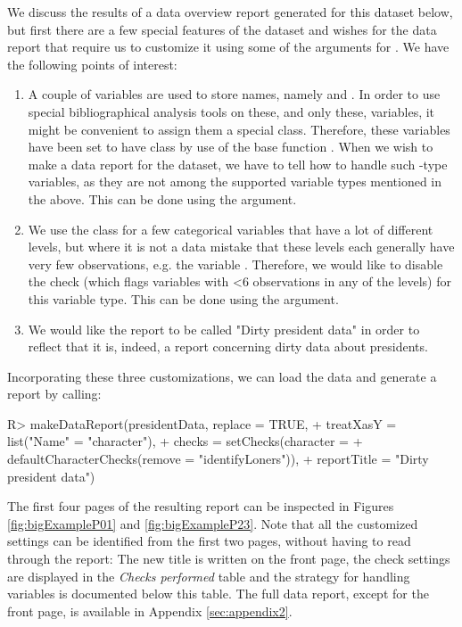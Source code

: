 \documentclass[article,shortnames]{jss}
\begin{document}
We discuss the results of a data overview report generated for this dataset below, but first there are a few special features of the dataset and wishes for the data report that require us to customize it using some of the arguments for . We have the following points of interest:
\begin{enumerate}
\item A couple of variables are used to store names, namely  and . In order to use special bibliographical analysis tools on these, and only these, variables, it might be convenient to assign them a special class. Therefore, these variables have been set to have class  by use of the base  function . When we wish to make a data report for the dataset, we have to tell  how to handle such -type variables, as they are not among the supported variable types mentioned in the above. This can be done using the  argument.
\item We use the  class for a few categorical variables that have a lot of different levels, but where it is not a data mistake that these levels each generally have very few observations, e.g. the variable . Therefore, we would like to disable the  check (which flags variables with <6 observations in any of the levels) for this variable type. This can be done using the  argument.
\item We would like the report to be called "Dirty president data" in order to reflect that it is, indeed, a report concerning dirty data about presidents.
\end{enumerate}
Incorporating these three customizations, we can load the data and generate a report by calling:

\begin{Schunk}
\begin{Sinput}
R> makeDataReport(presidentData, replace = TRUE, 
+    treatXasY = list("Name" = "character"),
+    checks = setChecks(character = 
+    defaultCharacterChecks(remove = "identifyLoners")),
+    reportTitle = "Dirty president data")
\end{Sinput}
\end{Schunk}

The first four pages of the resulting report can be inspected in Figures \ref{fig:bigExampleP01} and \ref{fig:bigExampleP23}. Note that all the customized settings can be identified from the first two pages, without having to read through the report: The new title is written on the front page, the check settings are displayed in the \textit{Checks performed} table and the strategy for handling  variables is documented below this table. The full data report, except for the front page, is available in Appendix \ref{sec:appendix2}. 
\end{document}
